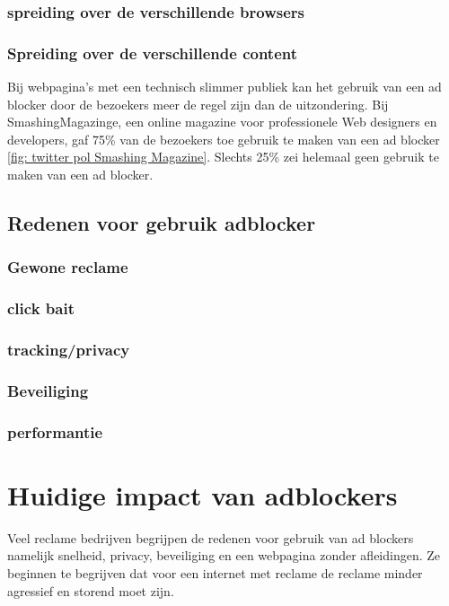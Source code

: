 \documentclass[pdftex,a4paper,12pt,twoside]{report}
\begin{document}
\subsection{spreiding over de verschillende browsers}
\label{sec spreiding over de verschillende browsers}

\subsection{Spreiding over de verschillende content}
\label{sec Spreiding over de verschillende content}

Bij webpagina's met een technisch slimmer publiek kan het gebruik van een ad blocker door de bezoekers meer de regel zijn dan de uitzondering. Bij SmashingMagazinge, een online magazine voor professionele Web designers en developers, gaf 75\% van de bezoekers toe gebruik te maken van een ad blocker \ref{fig: twitter pol Smashing Magazine}. Slechts 25\% zei helemaal geen gebruik te maken van een ad blocker.
\section{Redenen voor gebruik adblocker}
\label{sec:Redenen voor gebruik adblocker}
\subsection{Gewone reclame}
\label{sec Gewone reclame}
\subsection{click bait}
\label{sec click bait}
\subsection{tracking/privacy}
\label{sec tracking/privacy}
\subsection{Beveiliging}
\label{sec Beveiliging}
\subsection{performantie}
\label{sec performantie}

\chapter{Huidige impact van adblockers}
\label{ch:Huidige impact van adblockers}
Veel reclame bedrijven begrijpen de redenen voor gebruik van ad blockers namelijk snelheid, privacy, beveiliging en een webpagina zonder afleidingen. Ze beginnen te begrijven dat voor een internet met reclame de reclame minder agressief en storend moet zijn.
\end{document}

